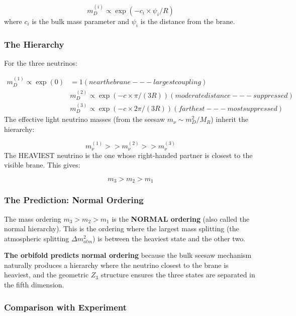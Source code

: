 \documentclass[aps,prd,preprint,superscriptaddress,longbibliography,floatfix]{revtex4-2}
\theoremstyle{remark}
\begin{document}
\begin{equation}
    m_D^{(i)} \propto \exp(-c_i \times \psi_i / R)
\end{equation}
where $c_i$ is the bulk mass parameter and $\psi_i$ is the distance from the brane.


\subsubsection{The Hierarchy}

For the three neutrinos:


\begin{align}
    m_D^{(1)} \propto \exp(0) &= 1 (near the brane --- largest coupling) \\
    & m_D^{(2)} \propto \exp(-c \times \pi/(3R)) (moderate distance --- suppressed) \\
    & m_D^{(3)} \propto \exp(-c \times 2\pi/(3R)) (farthest --- most suppressed)
\end{align}
The effective light neutrino masses (from the seesaw $m_\nu \sim  m_D^{2} / M_R$) inherit the hierarchy:


\begin{equation}
    m_\nu^{(1)} >> m_\nu^{(2)} >> m_\nu^{(3)}
\end{equation}
The HEAVIEST neutrino is the one whose right-handed partner is closest to the visible brane. This gives:


\begin{equation}
    m_{3} > m_{2} > m_{1}
\end{equation}

\subsubsection{The Prediction: Normal Ordering}

The mass ordering $m_{3} > m_{2} > m_{1}$ is the \textbf{NORMAL ordering} (also called the normal hierarchy). This is the ordering where the largest mass splitting (the atmospheric splitting $\Delta m^{2}_{atm}$) is between the heaviest state and the other two.

\textbf{The orbifold predicts normal ordering} because the bulk seesaw mechanism naturally produces a hierarchy where the neutrino closest to the brane is heaviest, and the geometric $Z_{3}$ structure ensures the three states are separated in the fifth dimension.


\subsubsection{Comparison with Experiment}
\end{document}
